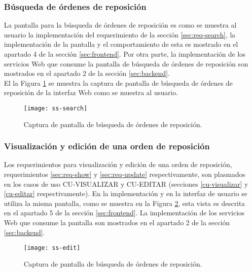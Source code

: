 \subsubsection{Búsqueda de órdenes de reposición}
La pantalla para la búsqueda de órdenes de reposición es como se muestra al usuario la implementación del requerimiento de la sección \ref{sec:req-search}, la implementación de la pantalla y el comportamiento de esta es mostrado en el apartado 4 de la sección \ref{sec:frontend}. Por otra parte, la implementación de los servicios Web que consume la pantalla de búsqueda de órdenes de reposición son mostrados en el apartado 2 de la sección \ref{sec:backend}.\\
El la Figura \ref{fig:ss-search} se muestra la captura de pantalla de búsqueda de órdenes de reposición de la interfaz Web como se muestra al usuario.
\begin{figure}[h]
	\centering
	\texttt{[image: ss-search]}
	\caption{Captura de pantalla de búsqueda de órdenes de reposición.}
	\label{fig:ss-search}
\end{figure}

\subsubsection{Visualización y edición de una orden de reposición}
Los requerimientos para visualización y edición de una orden de reposición, requerimientos \ref{sec:req-show} y \ref{sec:req-update} respectivamente, son plasmados en los casos de uso CU-VISUALIZAR y CU-EDITAR (secciones \ref{cu-visualizar} y \ref{cu-editar} respectivamente). En la implementación y en la interfaz de usuario se utiliza la misma pantalla, como se muestra en la Figura \ref{fig:ss-edit}, esta vista es descrita en el apartado 5 de la sección \ref{sec:frontend}. La implementación de los servicios Web que consume la pantalla son mostrados en el apartado 2 de la sección \ref{sec:backend}.
\begin{figure}[h]
	\centering
	\texttt{[image: ss-edit]}
	\caption{Captura de pantalla de búsqueda de órdenes de reposición.}
	\label{fig:ss-edit}
\end{figure}

